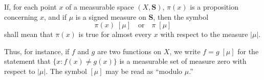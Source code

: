 If, for each point $x$ of a measurable space $(X, \mathbf{S})$, $\pi(x)$ is a proposition concerning $x$, and if $\mu$ is a signed measure on $\mathbf{S}$, then the symbol
$$\pi(x)\;[\mu] \quad \text{or} \quad \pi\;[\mu]$$
shall mean that $\pi(x)$ is true for almost every $x$ with respect to the measure $|\mu|$.

Thus, for instance, if $f$ and $g$ are two functions on $X$, we write $f = g\;[\mu]$ for the statement that $\{x : f(x) \neq g(x)\}$ is a measurable set of measure zero with respect to $|\mu|$. The symbol $[\mu]$ may be read as ``modulo $\mu$.''
